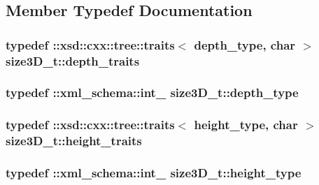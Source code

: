 \subsection{Member Typedef Documentation}
\hypertarget{classsize3D__t_a0d246a6f5c4afb7d912244a5226f01a0}{
\subsubsection[{depth\-\_\-traits}]{\setlength{\rightskip}{0pt plus 5cm}typedef \-::xsd\-::cxx\-::tree\-::traits$<$ {\bf depth\-\_\-type}, char $>$ {\bf size3\-D\-\_\-t\-::depth\-\_\-traits}}}\label{classsize3D__t_a0d246a6f5c4afb7d912244a5226f01a0}
\hypertarget{classsize3D__t_acc72088c95989e8ecee3fef8118cb91e}{
\subsubsection[{depth\-\_\-type}]{\setlength{\rightskip}{0pt plus 5cm}typedef \-::{\bf xml\-\_\-schema\-::int\-\_\-} {\bf size3\-D\-\_\-t\-::depth\-\_\-type}}}\label{classsize3D__t_acc72088c95989e8ecee3fef8118cb91e}
\hypertarget{classsize3D__t_a915f1e11ad383a66bf5263c0f71c1b45}{
\subsubsection[{height\-\_\-traits}]{\setlength{\rightskip}{0pt plus 5cm}typedef \-::xsd\-::cxx\-::tree\-::traits$<$ {\bf height\-\_\-type}, char $>$ {\bf size3\-D\-\_\-t\-::height\-\_\-traits}}}\label{classsize3D__t_a915f1e11ad383a66bf5263c0f71c1b45}
\hypertarget{classsize3D__t_adc8341bc222084318ef434ea22833f69}{
\subsubsection[{height\-\_\-type}]{\setlength{\rightskip}{0pt plus 5cm}typedef \-::{\bf xml\-\_\-schema\-::int\-\_\-} {\bf size3\-D\-\_\-t\-::height\-\_\-type}}}\label{classsize3D__t_adc8341bc222084318ef434ea22833f69}
